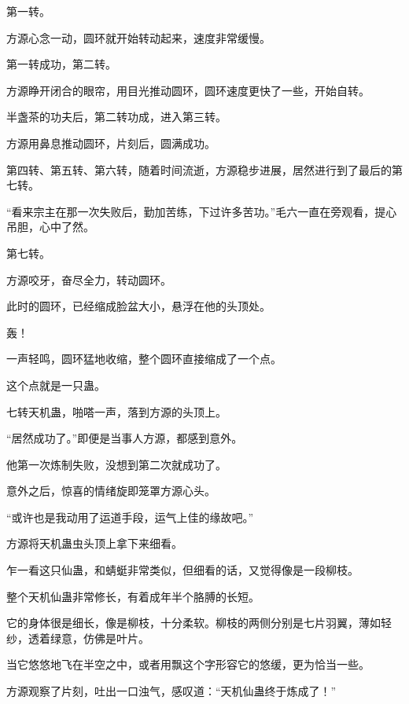 \begin{this_body}
第一转。

方源心念一动，圆环就开始转动起来，速度非常缓慢。

第一转成功，第二转。

方源睁开闭合的眼帘，用目光推动圆环，圆环速度更快了一些，开始自转。

半盏茶的功夫后，第二转功成，进入第三转。

方源用鼻息推动圆环，片刻后，圆满成功。

第四转、第五转、第六转，随着时间流逝，方源稳步进展，居然进行到了最后的第七转。

“看来宗主在那一次失败后，勤加苦练，下过许多苦功。”毛六一直在旁观看，提心吊胆，心中了然。

第七转。

方源咬牙，奋尽全力，转动圆环。

此时的圆环，已经缩成脸盆大小，悬浮在他的头顶处。

轰！

一声轻鸣，圆环猛地收缩，整个圆环直接缩成了一个点。

这个点就是一只蛊。

七转天机蛊，啪嗒一声，落到方源的头顶上。

“居然成功了。”即便是当事人方源，都感到意外。

他第一次炼制失败，没想到第二次就成功了。

意外之后，惊喜的情绪旋即笼罩方源心头。

“或许也是我动用了运道手段，运气上佳的缘故吧。”

方源将天机蛊虫头顶上拿下来细看。

乍一看这只仙蛊，和蜻蜓非常类似，但细看的话，又觉得像是一段柳枝。

整个天机仙蛊非常修长，有着成年半个胳膊的长短。

它的身体很是细长，像是柳枝，十分柔软。柳枝的两侧分别是七片羽翼，薄如轻纱，透着绿意，仿佛是叶片。

当它悠悠地飞在半空之中，或者用飘这个字形容它的悠缓，更为恰当一些。

方源观察了片刻，吐出一口浊气，感叹道：“天机仙蛊终于炼成了！”

\end{this_body}

